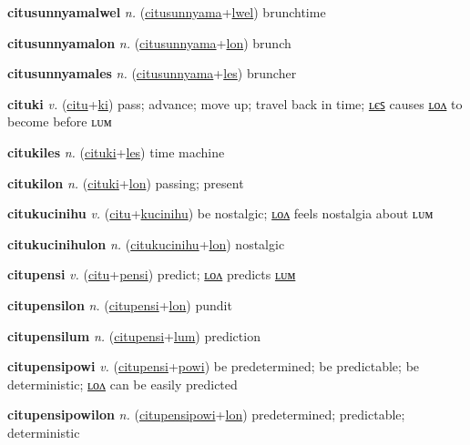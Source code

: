 \textbf{\hypertarget{citusunnyamalwel}{citusunnyamalwel}} \textit{n.} (\hyperlink{citusunnyama}{citusunnyama}+\allowbreak \hyperlink{lwel}{lwel})
brunchtime

\textbf{\hypertarget{citusunnyamalon}{citusunnyamalon}} \textit{n.} (\hyperlink{citusunnyama}{citusunnyama}+\allowbreak \hyperlink{lon}{lon})
brunch

\textbf{\hypertarget{citusunnyamales}{citusunnyamales}} \textit{n.} (\hyperlink{citusunnyama}{citusunnyama}+\allowbreak \hyperlink{les}{les})
bruncher

\textbf{\hypertarget{cituki}{cituki}} \textit{v.} (\hyperlink{citu}{citu}+\allowbreak \hyperlink{ki}{ki})
pass; advance; move up; travel back in time; \hyperlink{citukiles}{ʟєꜱ} causes \hyperlink{citukilon}{ʟᴏᴧ} to become before ʟᴜᴍ

\textbf{\hypertarget{citukiles}{citukiles}} \textit{n.} (\hyperlink{cituki}{cituki}+\allowbreak \hyperlink{les}{les})
time machine

\textbf{\hypertarget{citukilon}{citukilon}} \textit{n.} (\hyperlink{cituki}{cituki}+\allowbreak \hyperlink{lon}{lon})
passing; present

\textbf{\hypertarget{citukucinihu}{citukucinihu}} \textit{v.} (\hyperlink{citu}{citu}+\allowbreak \hyperlink{kucinihu}{kucinihu})
be nostalgic; \hyperlink{citukucinihulon}{ʟᴏᴧ} feels nostalgia about ʟᴜᴍ

\textbf{\hypertarget{citukucinihulon}{citukucinihulon}} \textit{n.} (\hyperlink{citukucinihu}{citukucinihu}+\allowbreak \hyperlink{lon}{lon})
nostalgic

\textbf{\hypertarget{citupensi}{citupensi}} \textit{v.} (\hyperlink{citu}{citu}+\allowbreak \hyperlink{pensi}{pensi})
predict; \hyperlink{citupensilon}{ʟᴏᴧ} predicts \hyperlink{citupensilum}{ʟᴜᴍ}

\textbf{\hypertarget{citupensilon}{citupensilon}} \textit{n.} (\hyperlink{citupensi}{citupensi}+\allowbreak \hyperlink{lon}{lon})
pundit

\textbf{\hypertarget{citupensilum}{citupensilum}} \textit{n.} (\hyperlink{citupensi}{citupensi}+\allowbreak \hyperlink{lum}{lum})
prediction

\textbf{\hypertarget{citupensipowi}{citupensipowi}} \textit{v.} (\hyperlink{citupensi}{citupensi}+\allowbreak \hyperlink{powi}{powi})
be predetermined; be predictable; be deterministic; \hyperlink{citupensipowilon}{ʟᴏᴧ} can be easily predicted

\textbf{\hypertarget{citupensipowilon}{citupensipowilon}} \textit{n.} (\hyperlink{citupensipowi}{citupensipowi}+\allowbreak \hyperlink{lon}{lon})
predetermined; predictable; deterministic

